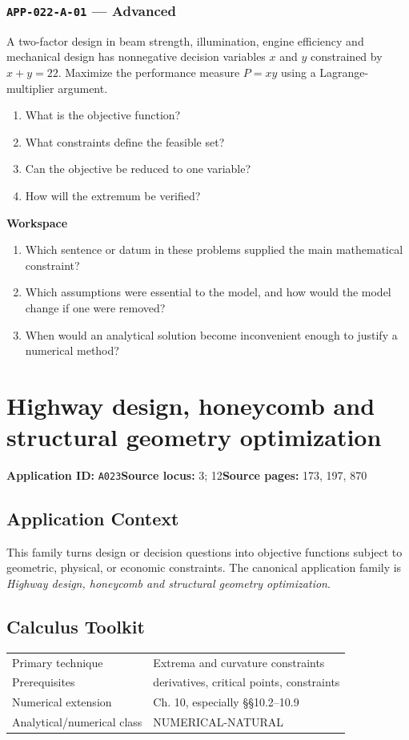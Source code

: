 \documentclass[11pt]{book}
\newcommand{\pid}[1]{\texttt{#1}}
\newcommand{\workspace}{\par\vspace{0.7in}\hrulefill\par\vspace{0.55in}\hrulefill\par}
\begin{document}
\subsection*{\pid{APP-022-A-01} — Advanced}
\begin{problembox}
A two-factor design in beam strength, illumination, engine efficiency and mechanical design has nonnegative decision variables $x$ and $y$ constrained by $x+y=22$. Maximize the performance measure $P=xy$ using a Lagrange-multiplier argument.
\end{problembox}
\begin{promptbox}\begin{enumerate}
\item What is the objective function?
\item What constraints define the feasible set?
\item Can the objective be reduced to one variable?
\item How will the extremum be verified?
\end{enumerate}\end{promptbox}
\textbf{Workspace}\workspace
\begin{reflectionbox}\begin{enumerate}
\item Which sentence or datum in these problems supplied the main mathematical constraint?
\item Which assumptions were essential to the model, and how would the model change if one were removed?
\item When would an analytical solution become inconvenient enough to justify a numerical method?
\end{enumerate}\end{reflectionbox}
\chapter{Highway design, honeycomb and structural geometry optimization}\label{app:A023}
\textbf{Application ID:} \pid{A023}\quad \textbf{Source locus:} 3; 12\quad \textbf{Source pages:} 173, 197, 870
\section*{Application Context}
This family turns design or decision questions into objective functions subject to geometric, physical, or economic constraints. The canonical application family is \emph{Highway design, honeycomb and structural geometry optimization}.
\section*{Calculus Toolkit}
\begin{tabularx}{\textwidth}{@{}lX@{}}\toprule
Primary technique & Extrema and curvature constraints \\
Prerequisites & derivatives, critical points, constraints \\
Numerical extension & Ch. 10, especially §§10.2–10.9 \\
Analytical/numerical class & NUMERICAL-NATURAL \\
\bottomrule\end{tabularx}
\end{document}
